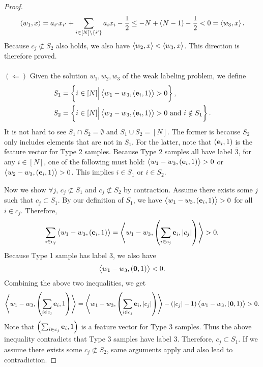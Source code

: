 \begin{proof}
 \begin{align*}
     \left\langle w_1, x \right\rangle= a_{i'}x_{i'} + \sum_{i\in [N]\backslash\{i'\}} a_ix_i - \frac{1}{2} \leq -N + (N-1)-\frac{1}{2} < 0 = \left\langle w_3, x \right\rangle. 
 \end{align*}
 Because $c_j \not\subset S_2$ also holds, we also have $\left\langle w_2, x \right\rangle<\left\langle w_3, x \right\rangle$. This direction is therefore proved. \\
 \ \\
 $(\Longleftarrow)$ Given the solution $w_1, w_2, w_3$ of the weak labeling problem, we define 
 \begin{align*}
     S_1 &= \left\{i\in [N] \Big| \left\langle w_1-w_3, (\mathbf{e}_i, 1) \right\rangle > 0 \right\}, \\
     S_2 &= \left\{i\in [N] \Big| \left\langle w_2-w_3, (\mathbf{e}_i, 1) \right\rangle > 0 \text{\ and\ } i\notin S_1 \right\}.
 \end{align*}
 It is not hard to see $S_1 \cap S_2 = \emptyset$ and $S_1\cup S_2 = [N]$. The former is because $S_2$ only includes elements that are not in $S_1$. For the latter, note that $(\mathbf{e}_i, 1)$ is the feature vector for Type 2 samples. Because Type 2 samples all have label $\overline{3}$, for any $i\in [N]$, one of the following must hold: $\left\langle w_1-w_3, (\mathbf{e}_i, 1) \right\rangle>0$ or $\left\langle w_2-w_3, (\mathbf{e}_i, 1) \right\rangle>0$. This implies $i\in S_1$ or $i\in S_2$. 
 
 Now we show $\forall j$, $c_j \not\subset S_1$ and $c_j \not\subset S_2$ by contraction. Assume there exists some $j$ such that $c_j \subset S_1$. By our definition of $S_1$, we have $\left\langle w_1-w_3, (\mathbf{e}_i, 1) \right\rangle > 0$ for all $i\in c_j$. Therefore, 
 \begin{align*}
     \sum_{i\in c_j}\left\langle w_1-w_3, \left(\mathbf{e}_i, 1\right) \right\rangle = \left\langle w_1-w_3, \left(\sum_{i\in c_j}\mathbf{e}_i, |c_j|\right) \right\rangle > 0. 
 \end{align*}
 Because Type 1 sample has label $3$, we also have
 \begin{align*}
     \left\langle w_1-w_3, \left(\mathbf{0}, 1\right) \right\rangle < 0. 
 \end{align*}
 Combining the above two inequalities, we get
 \begin{align*}
     \left\langle w_1-w_3, \left(\sum_{i\in c_j}\mathbf{e}_i, 1\right) \right\rangle = \left\langle w_1-w_3, \left(\sum_{i\in c_j}\mathbf{e}_i, |c_j|\right) \right\rangle - (|c_j|-1)\left\langle w_1-w_3, \left(\mathbf{0}, 1\right) \right\rangle>0.  
 \end{align*}
 Note that $\left(\sum_{i\in c_j}\mathbf{e}_i, 1\right)$ is a feature vector for Type 3 samples. Thus the above inequality contradicts that Type 3 samples have label 3. Therefore, $c_j \subset S_1$. If we assume there exists some $c_j \not\subset S_2$, same arguments apply and also lead to contradiction. 
\end{proof}